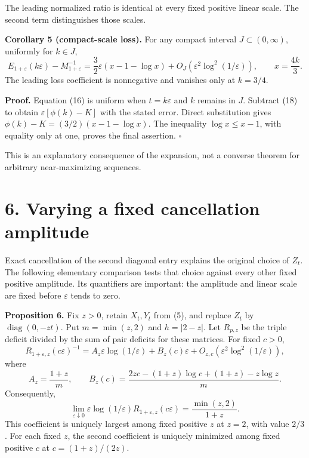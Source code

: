 \documentclass[11pt,a4paper]{article}
\begin{document}
The leading normalized ratio is identical at every fixed positive linear scale. The second term distinguishes those scales.

\textbf{Corollary 5 (compact-scale loss).} For any compact interval \(J\subset(0,\infty)\), uniformly for \(k\in J\), \[
E_{1+\varepsilon}(k\varepsilon)-M_{1+\varepsilon}^{-1}
=\frac32\varepsilon\left(x-1-\log x\right)
+O_J(\varepsilon^2\log^2(1/\varepsilon)),\qquad x=\frac{4k}{3}.
\] The leading loss coefficient is nonnegative and vanishes only at \(k=3/4\).

\textbf{Proof.} Equation (16) is uniform when \(t=k\varepsilon\) and \(k\) remains in \(J\). Subtract (18) to obtain \(\varepsilon[\phi(k)-K]\) with the stated error. Direct substitution gives \(\phi(k)-K=(3/2)(x-1-\log x)\). The inequality \(\log x\le x-1\), with equality only at one, proves the final assertion. \(\square\)

This is an explanatory consequence of the expansion, not a converse theorem for arbitrary near-maximizing sequences.

\section*{6. Varying a fixed cancellation amplitude}\label{varying-a-fixed-cancellation-amplitude}

Exact cancellation of the second diagonal entry explains the original choice of \(Z_t\). The following elementary comparison tests that choice against every other fixed positive amplitude. Its quantifiers are important: the amplitude and linear scale are fixed before \(\varepsilon\) tends to zero.

\textbf{Proposition 6.} Fix \(z>0\), retain \(X_t,Y_t\) from (5), and replace \(Z_t\) by \(\operatorname{diag}(0,-zt)\). Put \(m=\min(z,2)\) and \(h=|2-z|\). Let \(R_{p,z}\) be the triple deficit divided by the sum of pair deficits for these matrices. For fixed \(c>0\), \[
R_{1+\varepsilon,z}(c\varepsilon)^{-1}
=A_z\varepsilon\log(1/\varepsilon)+B_z(c)\varepsilon
+O_{z,c}(\varepsilon^2\log^2(1/\varepsilon)),
\] where \[
A_z=\frac{1+z}{m},\qquad
B_z(c)=\frac{2zc-(1+z)\log c+(1+z)-z\log z}{m}.
\] Consequently, \[
\lim_{\varepsilon\downarrow0}\varepsilon\log(1/\varepsilon)
 R_{1+\varepsilon,z}(c\varepsilon)=\frac{\min(z,2)}{1+z}.
\] This coefficient is uniquely largest among fixed positive \(z\) at \(z=2\), with value \(2/3\). For each fixed \(z\), the second coefficient is uniquely minimized among fixed positive \(c\) at \(c=(1+z)/(2z)\).
\end{document}
